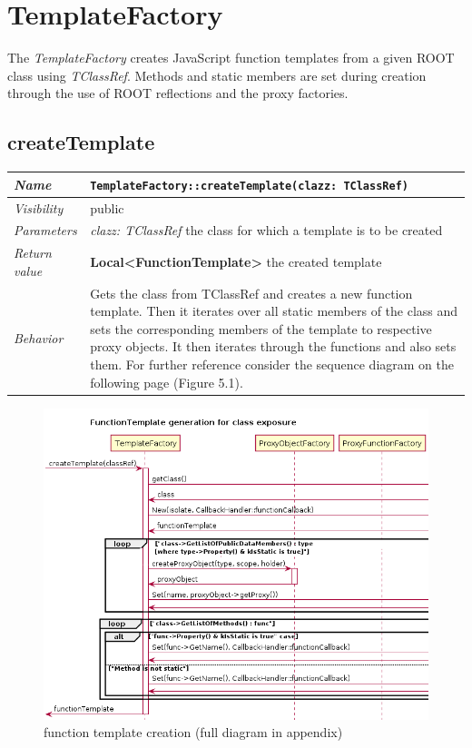 \chapter{TemplateFactory}
The \textit{TemplateFactory} creates JavaScript function templates from a given ROOT class using \textit{TClassRef}. Methods and static members are set during creation through the use of ROOT reflections and the proxy factories.

\section{createTemplate}
\begin{longtable}{p{3cm} @{\hskip 1cm} p{12cm}}
 \hline
\textit{Name} & \texttt{TemplateFactory::createTemplate(clazz: TClassRef)}\\
\hline
 \textit{Visibility} & public\\
\hline
\textit{Parameters} & \textit{clazz: TClassRef} the class for which a template is to be created \\
\hline
\textit{Return value} & \textbf{Local<FunctionTemplate>} the created template\\
  \hline
 \textit{Behavior} & Gets the class from TClassRef and creates a new function template.
			Then it iterates over all static members of the class and sets the
			corresponding members of the template to respective proxy objects.
			It then iterates through the functions and also sets them.
			For further reference consider the sequence diagram on the following page (Figure 5.1).\\
\hline
\end{longtable} \pagebreak

\begin{figure}[htb]
\includegraphics[width=16cm]{./latex/resources/functionTemplateGenerateCrop.png}
	\caption{function template creation (full diagram in appendix)}
\end{figure}
